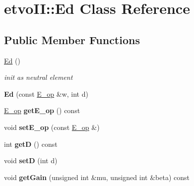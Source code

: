 \hypertarget{classetvo_i_i_1_1_ed}{}\section{etvo\+II\+:\+:Ed Class Reference}
\label{classetvo_i_i_1_1_ed}
\subsection*{Public Member Functions}
\begin{DoxyCompactItemize}
\item 
\mbox{\label{classetvo_i_i_1_1_ed_a2db9d90ab29eea4f124474d73c505701}} 
\mbox{\hyperlink{classetvo_i_i_1_1_ed_a2db9d90ab29eea4f124474d73c505701}{Ed}} ()
\begin{DoxyCompactList}\small\item\em init as neutral element \end{DoxyCompactList}\item 
\mbox{\label{classetvo_i_i_1_1_ed_a0f1b0b4fde0ec98d922a888ed0964aa3}} 
{\bfseries Ed} (const \mbox{\hyperlink{classetvo_i_i_1_1_e__op}{E\+\_\+op}} \&w, int d)
\item 
\mbox{\label{classetvo_i_i_1_1_ed_a6c8ef3c605faea88759229bb51da7f28}} 
\mbox{\hyperlink{classetvo_i_i_1_1_e__op}{E\+\_\+op}} {\bfseries get\+E\+\_\+op} () const
\item 
\mbox{\label{classetvo_i_i_1_1_ed_a8d913559f543304987c6b639fa20de40}} 
void {\bfseries set\+E\+\_\+op} (const \mbox{\hyperlink{classetvo_i_i_1_1_e__op}{E\+\_\+op}} \&)
\item 
\mbox{\label{classetvo_i_i_1_1_ed_ae68a7ba85ad141e8b8aa8c8634f27638}} 
int {\bfseries getD} () const
\item 
\mbox{\label{classetvo_i_i_1_1_ed_af565464c3e255b596d94edb68d4714ed}} 
void {\bfseries setD} (int d)
\item 
\mbox{\label{classetvo_i_i_1_1_ed_a3068df53ffd3216010498fe326c381d7}} 
void {\bfseries get\+Gain} (unsigned int \&mu, unsigned int \&beta) const
\item 

\end{DoxyCompactItemize}
